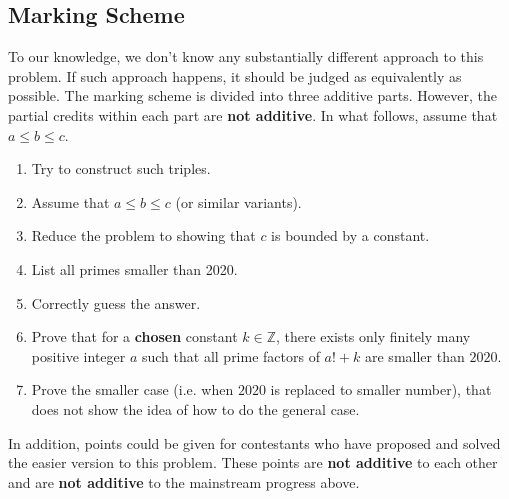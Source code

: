 \subsection{Marking Scheme}
To our knowledge, we don't know any substantially different approach to this problem. If such approach happens, it should be judged as equivalently as possible.
\nl The marking scheme is divided into three additive parts. However, the partial credits within each part are \textbf{not additive}.
\nl In what follows, assume that $a\leq b\leq c$.
\begin{enumerate}
        \begin{enumerate}
            \item Try to construct such triples.
            \item Assume that $a\leq b\leq c$ (or similar variants).
            \item Reduce the problem to showing that $c$ is bounded by a constant.
            \item List all primes smaller than 2020.
            \item Correctly guess the answer.
            \item Prove that for a \textbf{chosen} constant $k\in\mathbb{Z}$, there exists only finitely many positive integer $a$ such that all prime factors of $a!+k$ are smaller than $2020$.
            \item Prove the smaller case (i.e. when $2020$ is replaced to smaller number), that does not show the idea of how to do the general case.
        \end{enumerate}
        \begin{enumerate}
        \end{enumerate}
\end{enumerate}
In addition, points could be given for contestants who have proposed and solved the easier version to this problem. These points are \textbf{not additive} to each other and are \textbf{not additive} to the mainstream progress above.
\begin{enumerate}
\end{enumerate}
